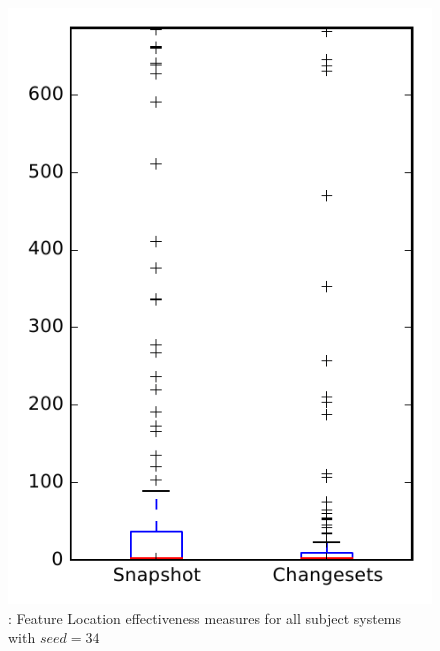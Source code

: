 
\begin{figure}
\centering
\includegraphics[height=0.4\textheight]{figures/flt_seed/rq1_overview_34}
\caption{\rone: Feature Location effectiveness measures for all subject systems with $seed=34$}
\label{fig:flt_seed:rq1:overview}
\end{figure}
